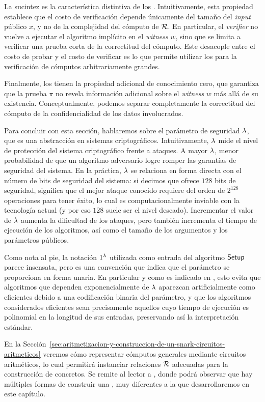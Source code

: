 La sucintez es la característica distintiva de los \SNARK. Intuitivamente, esta propiedad establece que el costo de verificación depende únicamente del tamaño del \textit{input} público $x$, y no de la complejidad del cómputo de $\mathcal{R}$. En particular, el \textit{verifier} no vuelve a ejecutar el algoritmo implícito en el \textit{witness} $w$, sino que se limita a verificar una prueba corta de la correctitud del cómputo. Este desacople entre el costo de probar y el costo de verificar es lo que permite utilizar los \SNARK para la verificación de cómputos arbitrariamente grandes.

Finalmente, los \zkSNARK tienen la propiedad adicional de conocimiento cero, que garantiza que la prueba $\pi$ no revela información adicional sobre el \textit{witness} $w$ más allá de su existencia. Conceptualmente, podemos separar completamente la correctitud del cómputo de la confidencialidad de los datos involucrados.

Para concluir con esta sección, hablaremos sobre el parámetro de seguridad $\lambda$, que es una abstracción en sistemas criptográficos. Intuitivamente, $\lambda$ mide el nivel de protección del sistema criptográfico frente a ataques. A mayor $\lambda$, menor probabilidad de que un algoritmo adversario logre romper las garantías de seguridad del sistema. En la práctica, $\lambda$ se relaciona en forma directa con el número de bits de seguridad del sistema: si decimos que ofrece $128$ bits de seguridad, significa que el mejor ataque conocido requiere del orden de $2^{128}$ operaciones para tener éxito, lo cual es computacionalmente inviable con la tecnología actual (y por eso $128$ suele ser el nivel deseado). Incrementar el valor de $\lambda$ aumenta la dificultad de los ataques, pero también incrementa el tiempo de ejecución de los algoritmos, así como el tamaño de los argumentos y los parámetros públicos.

Como nota al pie, la notación $1^\lambda$ utilizada como entrada del algoritmo $\mathsf{Setup}$ parece insensata, pero es una convención que indica que el parámetro se proporciona en forma unaria. En particular y como es indicado en \cite{Goldreich2001}, esto evita que algoritmos que dependen exponencialmente de $\lambda$ aparezcan artificialmente como eficientes debido a una codificación binaria del parámetro, y que los algoritmos considerados eficientes sean precisamente aquellos cuyo tiempo de ejecución es polinomial en la longitud de sus entradas, preservando así la interpretación estándar.

En la Sección~\ref{sec:aritmetizacion-y-construccion-de-un-snark-circuitos-aritmeticos} veremos cómo representar cómputos generales mediante circuitos aritméticos, lo cual permitirá instanciar relaciones $\mathcal{R}$ adecuadas para la construcción de \SNARK concretos. Se remite al lector a \cite{DBLP:journals/ftsec/Thaler22}, donde podrá observar que hay múltiples formas de construir una \SNARK, muy diferentes a la que desarrollaremos en este capítulo.
